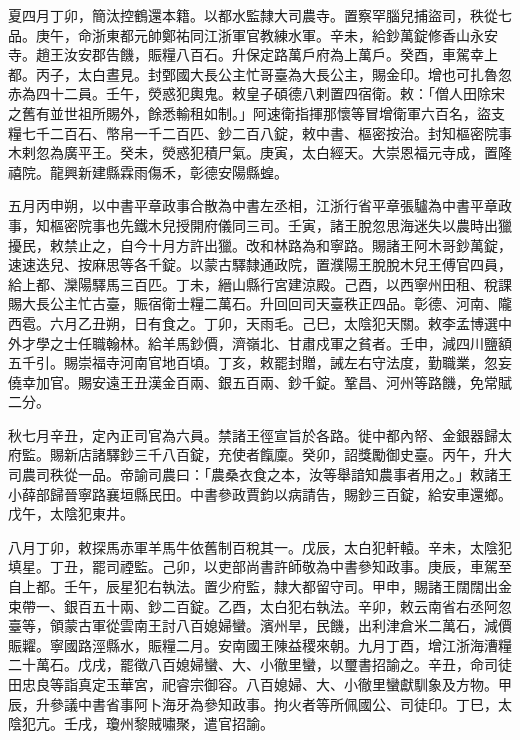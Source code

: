 \begin{pinyinscope}
 夏四月丁卯，簡汰控鶴還本籍。以都水監隸大司農寺。置察罕腦兒捕盜司，秩從七品。庚午，命浙東都元帥鄭祐同江浙軍官教練水軍。辛未，給鈔萬錠修香山永安寺。趙王汝安郡告饑，賑糧八百石。升保定路萬戶府為上萬戶。癸酉，車駕幸上都。丙子，太白晝見。封鄄國大長公主忙哥臺為大長公主，賜金印。增也可扎魯忽赤為四十二員。壬午，熒惑犯輿鬼。敕皇子碩德八剌置四宿衛。敕：「僧人田除宋之舊有並世祖所賜外，餘悉輸租如制。」阿速衛指揮那懷等冒增衛軍六百名，盜支糧七千二百石、幣帛一千二百匹、鈔二百八錠，敕中書、樞密按治。封知樞密院事木剌忽為廣平王。癸未，熒惑犯積尸氣。庚寅，太白經天。大崇恩福元寺成，置隆禧院。龍興新建縣霖雨傷禾，彰德安陽縣蝗。



 五月丙申朔，以中書平章政事合散為中書左丞相，江浙行省平章張驢為中書平章政事，知樞密院事也先鐵木兒授開府儀同三司。壬寅，諸王脫忽思海迷失以農時出獵擾民，敕禁止之，自今十月方許出獵。改和林路為和寧路。賜諸王阿木哥鈔萬錠，速速迭兒、按麻思等各千錠。以蒙古驛隸通政院，置濮陽王脫脫木兒王傅官四員，給上都、灤陽驛馬三百匹。丁未，縉山縣行宮建涼殿。己酉，以西寧州田租、稅課賜大長公主忙古臺，賑宿衛士糧二萬石。升回回司天臺秩正四品。彰德、河南、隴西雹。六月乙丑朔，日有食之。丁卯，天雨毛。己巳，太陰犯天關。敕李孟博選中外才學之士任職翰林。給羊馬鈔價，濟嶺北、甘肅戍軍之貧者。壬申，減四川鹽額五千引。賜崇福寺河南官地百頃。丁亥，敕罷封贈，誡左右守法度，勤職業，忽妄僥幸加官。賜安遠王丑漢金百兩、銀五百兩、鈔千錠。鞏昌、河州等路饑，免常賦二分。



 秋七月辛丑，定內正司官為六員。禁諸王徑宣旨於各路。徙中都內帑、金銀器歸太府監。賜新店諸驛鈔三千八百錠，充使者餼廩。癸卯，詔獎勵御史臺。丙午，升大司農司秩從一品。帝諭司農曰：「農桑衣食之本，汝等舉諳知農事者用之。」敕諸王小薛部歸晉寧路襄垣縣民田。中書參政賈鈞以病請告，賜鈔三百錠，給安車還鄉。戊午，太陰犯東井。



 八月丁卯，敕探馬赤軍羊馬牛依舊制百稅其一。戊辰，太白犯軒轅。辛未，太陰犯填星。丁丑，罷司禋監。己卯，以吏部尚書許師敬為中書參知政事。庚辰，車駕至自上都。壬午，辰星犯右執法。置少府監，隸大都留守司。甲申，賜諸王闊闊出金束帶一、銀百五十兩、鈔二百錠。乙酉，太白犯右執法。辛卯，敕云南省右丞阿忽臺等，領蒙古軍從雲南王討八百媳婦蠻。濱州旱，民饑，出利津倉米二萬石，減價賑糶。寧國路涇縣水，賑糧二月。安南國王陳益稷來朝。九月丁酉，增江浙海漕糧二十萬石。戊戌，罷徵八百媳婦蠻、大、小徹里蠻，以璽書招諭之。辛丑，命司徒田忠良等詣真定玉華宮，祀睿宗御容。八百媳婦、大、小徹里蠻獻馴象及方物。甲辰，升參議中書省事阿卜海牙為參知政事。拘火者等所佩國公、司徒印。丁巳，太陰犯亢。壬戌，瓊州黎賊嘯聚，遣官招諭。




\end{pinyinscope}
